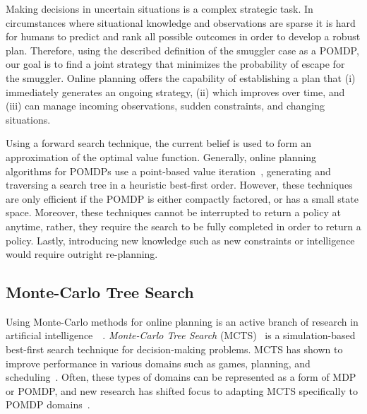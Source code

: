 \documentclass[conference]{IEEEtran}
\begin{document}
Making decisions in uncertain situations is a complex strategic task. In circumstances where situational knowledge and observations are sparse it is hard for humans to predict and rank all possible outcomes in order to develop a robust plan. Therefore, using the described definition of the smuggler case as a POMDP, our goal is to find a joint strategy that minimizes the probability of escape for the smuggler. Online planning offers the capability of establishing a plan that (i) immediately generates an ongoing strategy, (ii) which improves over time, and (iii) can manage incoming observations, sudden constraints, and changing situations. 

Using a forward search technique, the current belief is used to form an approximation of the optimal value function. Generally, online planning algorithms for POMDPs use a point-based value iteration~\cite{pineau2006anytime,ross2008online}, generating and traversing a search tree in a heuristic best-first order. However, these techniques are only efficient if the POMDP is either compactly factored, or has a small state space. Moreover, these techniques cannot be interrupted to return a policy at anytime, rather, they require the search to be fully completed in order to return a policy. Lastly, introducing new knowledge such as new constraints or intelligence would require outright re-planning.

\subsection{Monte-Carlo Tree Search}
\label{sub:mcts}

Using Monte-Carlo methods for online planning is an active branch of research in artificial intelligence~\cf~\cite{browne2012survey}. {\it Monte-Carlo Tree Search} (MCTS)~\cite{coulom2007efficient,kocsis2006bandit} is a simulation-based best-first search technique for decision-making problems. MCTS has shown to improve performance in various domains such as games, planning, and scheduling~\cite{browne2012survey}. Often, these types of domains can be represented as a form of MDP or POMDP, and new research has shifted focus to adapting MCTS specifically to POMDP domains~\cite{silver2010monte,Feldman12BRUE}. 
\end{document}
